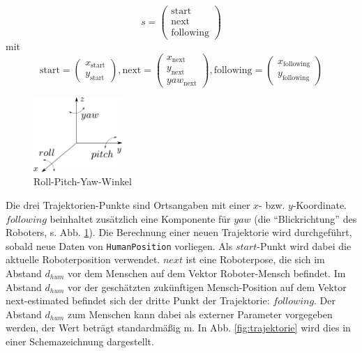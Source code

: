 \begin{equation}
	s =	\begin{pmatrix} \text{start} \\ \text{next} \\ \text{following} \end{pmatrix}
\end{equation}
mit 
\begin{equation}
	\text{start} = 		\begin{pmatrix}	x_{\text{start}} \\ 		y_{\text{start}}												\end{pmatrix},
	\text{next} = 			\begin{pmatrix} x_{\text{next}} \\ 			y_{\text{next}} \\ 		yaw_{\text{next}}	\end{pmatrix},
	\text{following} =	\begin{pmatrix}	x_{\text{following}} \\ y_{\text{following}}										\end{pmatrix}
\end{equation}

\begin{figure}[h]
	\center
	\includegraphics[width=0.3\textwidth]{graphics/roll_pitch_yaw.pdf}
	\caption{Roll-Pitch-Yaw-Winkel \cite{rollPitchYaw}}
	\label{fig:roll_pitch_yaw}
\end{figure}
Die drei Trajektorien-Punkte sind Ortsangaben mit einer $x$- bzw. $y$-Koordinate.
$following$ beinhaltet zusätzlich eine Komponente für $yaw$ (die ``Blickrichtung'' des Roboters, s. Abb. \ref{fig:roll_pitch_yaw}).
Die Berechnung einer neuen Trajektorie wird durchgeführt, sobald neue Daten von \lstinline{HumanPosition} vorliegen.
Als $start$-Punkt wird dabei die aktuelle Roboterposition verwendet.
$next$ ist eine Roboterpose, die sich im Abstand $d_{hum}$ vor dem Menschen auf dem Vektor Roboter-Mensch befindet.
Im Abstand $d_{hum}$ vor der geschätzten zukünftigen Mensch-Position auf dem Vektor next-estimated befindet sich der dritte Punkt der Trajektorie: $following$.
Der Abstand $d_{hum}$ zum Menschen kann dabei als externer Parameter vorgegeben werden, der Wert beträgt standardmäßig \unit[1,75]{m}.
In Abb. \ref{fig:trajektorie} wird dies in einer Schemazeichnung dargestellt.

